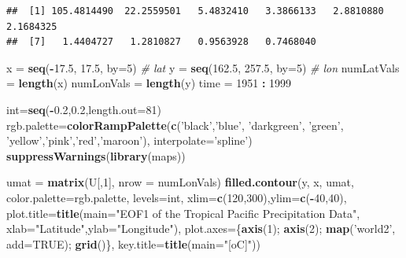 \documentclass[
]{article}
\newenvironment{Shaded}{\begin{snugshade}}{\end{snugshade}}
\newcommand{\CommentTok}[1]{\textcolor[rgb]{0.56,0.35,0.01}{\textit{#1}}}
\newcommand{\DataTypeTok}[1]{\textcolor[rgb]{0.13,0.29,0.53}{#1}}
\newcommand{\DecValTok}[1]{\textcolor[rgb]{0.00,0.00,0.81}{#1}}
\newcommand{\FloatTok}[1]{\textcolor[rgb]{0.00,0.00,0.81}{#1}}
\newcommand{\KeywordTok}[1]{\textcolor[rgb]{0.13,0.29,0.53}{\textbf{#1}}}
\newcommand{\NormalTok}[1]{#1}
\newcommand{\OperatorTok}[1]{\textcolor[rgb]{0.81,0.36,0.00}{\textbf{#1}}}
\newcommand{\OtherTok}[1]{\textcolor[rgb]{0.56,0.35,0.01}{#1}}
\newcommand{\StringTok}[1]{\textcolor[rgb]{0.31,0.60,0.02}{#1}}
\begin{document}
\begin{verbatim}
##  [1] 105.4814490  22.2559501   5.4832410   3.3866133   2.8810880   2.1684325
##  [7]   1.4404727   1.2810827   0.9563928   0.7468040
\end{verbatim}

\begin{Shaded}
\begin{Highlighting}[]
\NormalTok{x =}\StringTok{ }\KeywordTok{seq}\NormalTok{(}\OperatorTok{-}\FloatTok{17.5}\NormalTok{, }\FloatTok{17.5}\NormalTok{, }\DataTypeTok{by=}\DecValTok{5}\NormalTok{)  }\CommentTok{# lat}
\NormalTok{y =}\StringTok{ }\KeywordTok{seq}\NormalTok{(}\FloatTok{162.5}\NormalTok{, }\FloatTok{257.5}\NormalTok{, }\DataTypeTok{by=}\DecValTok{5}\NormalTok{) }\CommentTok{# lon}
\NormalTok{numLatVals =}\StringTok{ }\KeywordTok{length}\NormalTok{(x)}
\NormalTok{numLonVals =}\StringTok{ }\KeywordTok{length}\NormalTok{(y)}
\NormalTok{time =}\StringTok{ }\DecValTok{1951} \OperatorTok{:}\StringTok{ }\DecValTok{1999}

\NormalTok{int=}\KeywordTok{seq}\NormalTok{(}\OperatorTok{-}\FloatTok{0.2}\NormalTok{,}\FloatTok{0.2}\NormalTok{,}\DataTypeTok{length.out=}\DecValTok{81}\NormalTok{)}
\NormalTok{rgb.palette=}\KeywordTok{colorRampPalette}\NormalTok{(}\KeywordTok{c}\NormalTok{(}\StringTok{'black'}\NormalTok{,}\StringTok{'blue'}\NormalTok{, }\StringTok{'darkgreen'}\NormalTok{,}
                               \StringTok{'green'}\NormalTok{, }\StringTok{'yellow'}\NormalTok{,}\StringTok{'pink'}\NormalTok{,}\StringTok{'red'}\NormalTok{,}\StringTok{'maroon'}\NormalTok{),}
                             \DataTypeTok{interpolate=}\StringTok{'spline'}\NormalTok{)}
\KeywordTok{suppressWarnings}\NormalTok{(}\KeywordTok{library}\NormalTok{(maps))}

\NormalTok{umat =}\StringTok{ }\KeywordTok{matrix}\NormalTok{(U[,}\DecValTok{1}\NormalTok{], }\DataTypeTok{nrow =}\NormalTok{ numLonVals)}
\KeywordTok{filled.contour}\NormalTok{(y, x, umat, }\DataTypeTok{color.palette=}\NormalTok{rgb.palette, }\DataTypeTok{levels=}\NormalTok{int,}
               \DataTypeTok{xlim=}\KeywordTok{c}\NormalTok{(}\DecValTok{120}\NormalTok{,}\DecValTok{300}\NormalTok{),}\DataTypeTok{ylim=}\KeywordTok{c}\NormalTok{(}\OperatorTok{-}\DecValTok{40}\NormalTok{,}\DecValTok{40}\NormalTok{),}
               \DataTypeTok{plot.title=}\KeywordTok{title}\NormalTok{(}\DataTypeTok{main=}\StringTok{"EOF1 of the Tropical Pacific Precipitation Data"}\NormalTok{,}
                                \DataTypeTok{xlab=}\StringTok{"Latitude"}\NormalTok{,}\DataTypeTok{ylab=}\StringTok{"Longitude"}\NormalTok{),}
               \DataTypeTok{plot.axes=}\NormalTok{\{}\KeywordTok{axis}\NormalTok{(}\DecValTok{1}\NormalTok{); }\KeywordTok{axis}\NormalTok{(}\DecValTok{2}\NormalTok{); }\KeywordTok{map}\NormalTok{(}\StringTok{'world2'}\NormalTok{, }\DataTypeTok{add=}\OtherTok{TRUE}\NormalTok{); }\KeywordTok{grid}\NormalTok{()\},}
               \DataTypeTok{key.title=}\KeywordTok{title}\NormalTok{(}\DataTypeTok{main=}\StringTok{"[oC]"}\NormalTok{))}
\end{Highlighting}
\end{Shaded}
\end{document}
